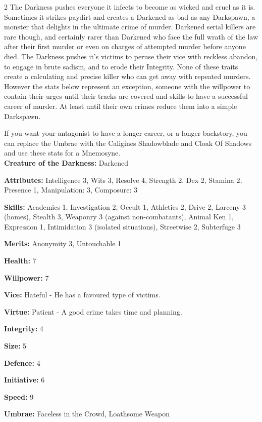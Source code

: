 \begin{multicols}{2}
The Darkness pushes everyone it infects to become as wicked and cruel as it is. Sometimes it strikes paydirt and creates a Darkened as bad as any Darkspawn, a monster that delights in the ultimate crime of murder. Darkened serial killers are rare though, and certainly rarer than Darkened who face the full wrath of the law after their first murder or even on charges of attempted murder before anyone died. The Darkness pushes it's victims to peruse their vice with reckless abandon, to engage in brute sadism, and to erode their Integrity. None of these traits create a calculating and precise killer who can get away with repeated murders. However the stats below represent an exception, someone with the willpower to contain their urges until their tracks are covered and skills to have a successful career of murder. At least until their own crimes reduce them into a simple Darkspawn.

If you want your antagonist to have a longer career, or a longer backstory, you can replace the Umbrae with the Caligines Shadowblade and Cloak Of Shadows and use these stats for a Mnemosyne. \\

\noindent \textbf{Creature of the Darkness:} Darkened

\noindent \textbf{Attributes:} Intelligence 3, Wits 3, Resolve 4, Strength 2, Dex 2, Stamina 2, Presence 1, Manipulation: 3, Composure: 3

\noindent \textbf{Skills:} Academics 1, Investigation 2, Occult 1, Athletics 2, Drive 2, Larceny 3 (homes), Stealth 3, Weaponry 3 (against non-combatants), Animal Ken 1, Expression 1, Intimidation 3 (isolated situations), Streetwise 2, Subterfuge 3

\noindent \textbf{Merits:} Anonymity 3, Untouchable 1

\noindent \textbf{Health:} 7

\noindent \textbf{Willpower:} 7

\noindent \textbf{Vice:} Hateful - He has a favoured type of victims. 

\noindent \textbf{Virtue:} Patient - A good crime takes time and planning. 

\noindent \textbf{Integrity:} 4

\noindent \textbf{Size:} 5

\noindent \textbf{Defence:} 4

\noindent \textbf{Initiative:} 6

\noindent \textbf{Speed:} 9

\noindent \textbf{Umbrae:} Faceless in the Crowd, Loathsome Weapon



\end{multicols}
